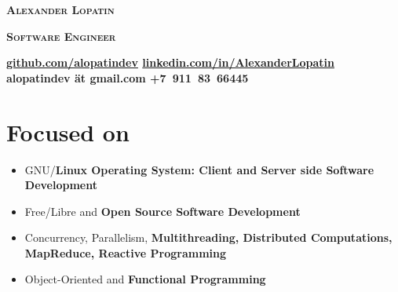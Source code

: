 \begin{center}
\fontsize{23pt}{15pt}\selectfont
\textsc{\lsstyle\bfseries Alexander Lopatin\mdseries}

\vspace{15pt}

\fontsize{18pt}{10pt}\selectfont
\textsc{\bfseries Software Engineer\mdseries}

\vspace{6pt}


\horizline

\vspace{0.1cm}

{
\bfseries
\fontsize{8pt}{8pt}\selectfont
\faGithub\hspace{0.1cm}\href{https://github.com/alopatindev?tab=repositories}{github.com/alopatindev}
\contactDelimiter\faLinkedinSquare\hspace{0.1cm}\href{https://www.linkedin.com/in/AlexanderLopatin}{linkedin.com/in/AlexanderLopatin}
\contactDelimiter\faEnvelope\hspace{0.1cm}alopatindev ät gmail.com
\contactDelimiter\faMobilePhone\hspace{0.1cm}+7~911~83~66445
\mdseries
}

\end{center}

\fontsize{11pt}{11.9pt}\selectfont

\section*{Focused on}

\begin{itemize}[rightmargin=\dimexpr\linewidth-18cm-\leftmargin\relax]
\item GNU/\bfseries Linux \mdseries Operating System: \bfseries Client \mdseries and Server side Software Development
\item Free/Libre and \bfseries Open Source \mdseries Software Development
\item Concurrency, Parallelism, \bfseries Multithreading\mdseries, Distributed Computations, MapReduce, \bfseries Reactive \mdseries Programming
\item Object-Oriented and \bfseries Functional \mdseries Programming
\end{itemize}

